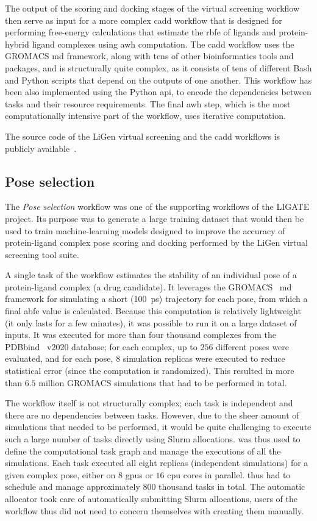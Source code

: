 The output of the scoring and docking stages of the virtual screening workflow then serve as input
for a more complex \gls{cadd} workflow that is designed for performing free-energy
calculations that estimate the \gls{rbfe} of ligands and protein-hybrid ligand
complexes using \gls{awh} computation. The \gls{cadd} workflow uses the
GROMACS \gls{md} framework, along with tens of other bioinformatics tools and
packages, and is structurally quite complex, as it consists of tens of different Bash and Python
scripts that depend on the outputs of one another. This workflow has been also implemented using
the \hyperqueue{} Python \gls{api}, to encode the dependencies between
tasks and their resource requirements. The final \gls{awh} step, which is the most
computationally intensive part of the workflow, uses iterative computation.

The source code of the LiGen virtual screening and the \gls{cadd} workflows is
publicly available~\cite{cadd-workflow}.

\subsection{Pose selection}
The \emph{Pose selection} workflow was one of the supporting workflows of the LIGATE project. Its
purpose was to generate a large training dataset that would then be used to train machine-learning
models designed to improve the accuracy of protein-ligand complex pose scoring and docking
performed by the LiGen virtual screening tool suite.

A single task of the workflow estimates the stability of an individual pose of a protein-ligand
complex (a drug candidate). It leverages the GROMACS~\cite{gromacs}
\gls{md} framework for simulating a short (\SI{100}{\pico\second}) trajectory for
each pose, from which a final \gls{abfe} value is calculated. Because this computation
is relatively lightweight (it only lasts for a few minutes), it was possible to run it on a large
dataset of inputs. It was executed for more than four thousand complexes from the
PDBbind~\cite{pdbbind} v2020 database; for each complex, up to $256$
different poses were evaluated, and for each pose, $8$ simulation replicas were
executed to reduce statistical error (since the computation is randomized). This resulted in more
than $6.5$ million GROMACS simulations that had to be performed in total.

The workflow itself is not structurally complex; each task is independent and there are no
dependencies between tasks. However, due to the sheer amount of simulations that needed to be
performed, it would be quite challenging to execute such a large number of tasks directly using
Slurm allocations. \hyperqueue{} was thus used to define the computational task graph and
manage the executions of all the simulations. Each task executed all eight replicas (independent
simulations) for a given complex pose, either on $8$ \glspl{gpu} or
$16$ \gls{cpu} cores in parallel. \hyperqueue{} thus had
to schedule and manage approximately $800$ thousand tasks in total. The automatic
allocator took care of automatically submitting Slurm allocations, users of the workflow thus did
not need to concern themselves with creating them manually.

